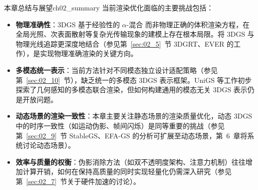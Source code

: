 \begin{futurebox}{本章总结与展望}{ch02_summary}
当前渲染优化面临的主要挑战包括：
\begin{itemize}
\item \textbf{物理准确性}：3DGS 基于经验性的 $\alpha$-混合 而非物理正确的体积渲染方程，在全局光照、次表面散射等复杂光传输现象的建模上存在根本局限。将 3DGS 与物理光线追踪更深度地结合（参见第~\ref{sec:02_5}~节 3DGRT、EVER 的工作），是实现物理准确渲染的关键方向。
\item \textbf{多模态统一表示}：当前方法针对不同模态独立设计适配策略（参见第~\ref{sec:02_10}~节），缺乏统一的多模态 3DGS 表示框架。UniGS 等工作初步探索了几何感知的多模态联合渲染，但如何构建通用的模态无关 3DGS 表示仍是开放问题。
\item \textbf{动态场景的渲染一致性}：本章主要关注静态场景的渲染质量优化，动态 3DGS 中的时序一致性（如运动伪影、帧间闪烁）是同等重要的挑战（参见第~\ref{sec:02_9}~节 StableGS、EFA-GS 的分析可扩展至动态场景，第~6~章将系统讨论动态场景）。
\item \textbf{效率与质量的权衡}：伪影消除方法（如双不透明度架构、注意力机制）往往增加计算开销，如何在保持高质量的同时实现轻量化仍需深入研究（参见第~\ref{sec:02_7}~节关于硬件加速的讨论）。
\end{itemize}
\end{futurebox}
